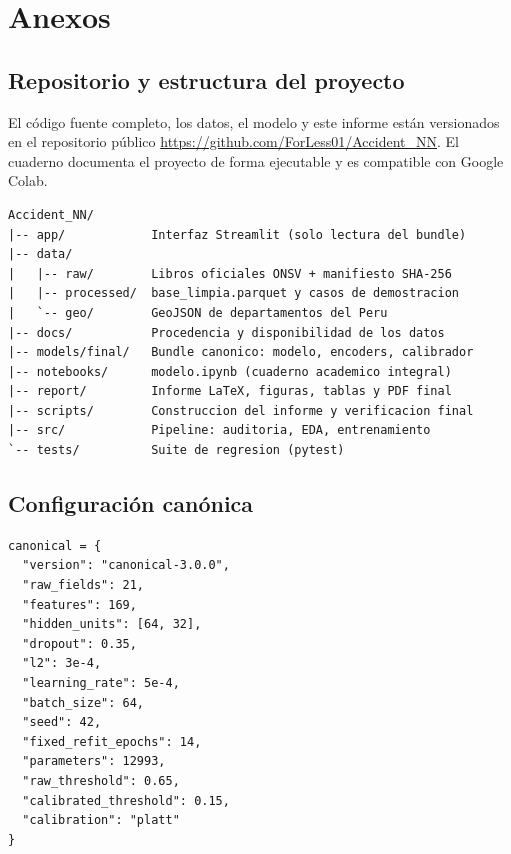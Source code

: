 \section{Anexos}\label{sec:anexos}

\subsection{Repositorio y estructura del proyecto}
El código fuente completo, los datos, el modelo y este informe están versionados en el repositorio público \url{https://github.com/ForLess01/Accident_NN}. El cuaderno  documenta el proyecto de forma ejecutable y es compatible con Google Colab.

\begin{lstlisting}[language={}, numbers=none]
Accident_NN/
|-- app/            Interfaz Streamlit (solo lectura del bundle)
|-- data/
|   |-- raw/        Libros oficiales ONSV + manifiesto SHA-256
|   |-- processed/  base_limpia.parquet y casos de demostracion
|   `-- geo/        GeoJSON de departamentos del Peru
|-- docs/           Procedencia y disponibilidad de los datos
|-- models/final/   Bundle canonico: modelo, encoders, calibrador
|-- notebooks/      modelo.ipynb (cuaderno academico integral)
|-- report/         Informe LaTeX, figuras, tablas y PDF final
|-- scripts/        Construccion del informe y verificacion final
|-- src/            Pipeline: auditoria, EDA, entrenamiento
`-- tests/          Suite de regresion (pytest)
\end{lstlisting}

\subsection{Configuración canónica}
\begin{lstlisting}
canonical = {
  "version": "canonical-3.0.0",
  "raw_fields": 21,
  "features": 169,
  "hidden_units": [64, 32],
  "dropout": 0.35,
  "l2": 3e-4,
  "learning_rate": 5e-4,
  "batch_size": 64,
  "seed": 42,
  "fixed_refit_epochs": 14,
  "parameters": 12993,
  "raw_threshold": 0.65,
  "calibrated_threshold": 0.15,
  "calibration": "platt"
}
\end{lstlisting}

